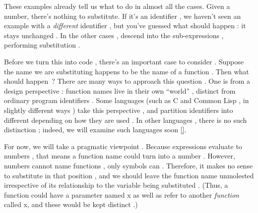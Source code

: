 \clearpage
These examples already tell us what to do in almost all the cases.  Given a number,
there’s nothing to substitute.  If it’s an
identifier , we haven’t seen an example with a
\emph{different} identifier , but you’ve guessed what should happen : it stays unchanged . In the
other cases , descend into the sub-expressions , performing substitution .

Before we turn this into code ,
there’s an important case to consider .
Suppose the name we are substituting happens to be the name of a function
. Then what
should happen \,?
There are many ways to approach this question . One is from a design perspective : function names live in their own ``world'' , distinct from ordinary program identifiers . Some languages  (such as C and Common Lisp , in
slightly different ways ) take this perspective
, and partition identifiers into different
 
depending on how they are used .
In other languages , there is no such distinction ; indeed, we will examine such languages soon  \ref{}.

For now, we will take a pragmatic viewpoint . Because expressions evaluate to numbers , that means a function name could turn into a number
. However, numbers
cannot name functions , only
symbols can . Therefore, it makes no sense
to substitute in that position , and we should leave the function name unmolested  irrespective of its relationship to the
variable being substituted . (Thus, a function could have a parameter named  x as well as refer to another
\emph{function} called  x, and these would be kept distinct .)

